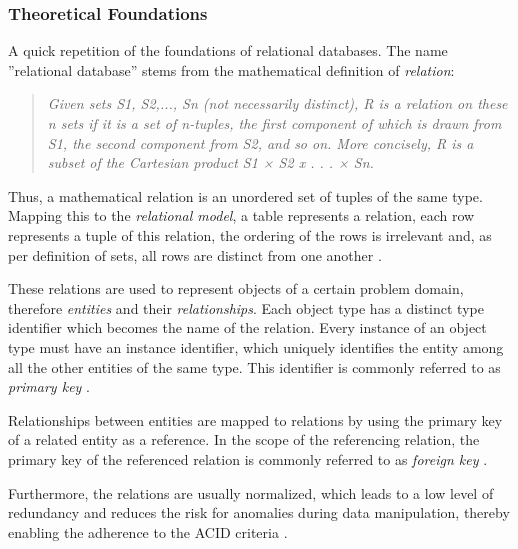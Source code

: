 \subsubsection{Theoretical Foundations} \label{sec:Theoretical Foundations Relational Database}
A quick repetition of the foundations of relational databases. The name ''relational database'' stems from the mathematical definition of \emph{relation}: 

\begin{quote}
	\textit{Given sets S1, S2,..., Sn (not necessarily distinct), R is a relation on these n sets if it is a set of n-tuples, the first component of which is drawn from S1, the second component from S2, and so on. More concisely, R is a subset of the Cartesian product S1 × S2 x . . . × Sn.}
	\cite{RelationalDatabaseModel}
\end{quote}

Thus, a mathematical relation is an unordered set of tuples of the same type. Mapping this to the \emph{relational model}, a table represents a relation, each row represents a tuple of this relation, the ordering of the rows is irrelevant and, as per definition of sets, all rows are distinct from one another \cite{RelationalDatabaseModel}.\par
These relations are used to represent objects of a certain problem domain, therefore \emph{entities} and their \emph{relationships}. Each object type has a distinct type identifier which becomes the name of the relation. Every instance of an object type must have an instance identifier, which uniquely identifies the entity among all the other entities of the same type. This identifier is commonly referred to as \emph{primary key} \cite{RelationalDatabaseModel}.\par
Relationships between entities are mapped to relations by using the primary key of a related entity as a reference. In the scope of the referencing relation, the primary key of the referenced relation is commonly referred to as \emph{foreign key} \cite{RelationalDatabaseModel}.\par
Furthermore, the relations are usually normalized, which leads to a low level of redundancy and reduces the risk for anomalies during data manipulation, thereby enabling the adherence to the ACID criteria \cite{RelationalDatabaseModel}.\\

